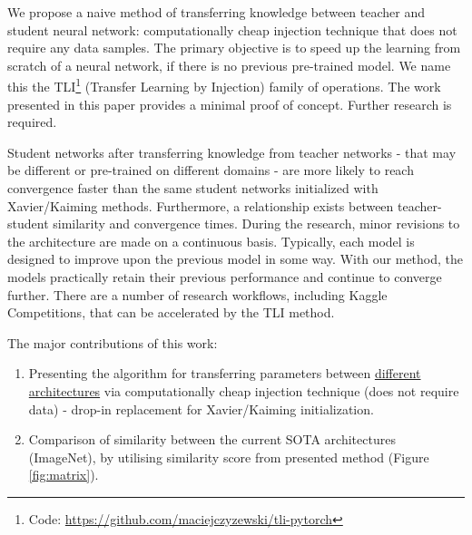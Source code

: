 \documentclass{article} %
\begin{document}

We propose a naive method of transferring knowledge between teacher and student
neural network: computationally cheap injection technique that does not require
any data samples.
%
The primary objective is to speed up the learning from scratch of a neural
network, if there is no previous pre-trained model.
%
We name this the TLI\footnote{Code: \url{https://github.com/maciejczyzewski/tli-pytorch}}
 (Transfer Learning by Injection) family of operations.
%
The work presented in this paper provides a minimal proof of concept. Further
research is required.

Student networks after transferring knowledge from teacher networks - that may
be different or pre-trained on different domains - are more likely to reach
convergence faster than the same student networks initialized with
Xavier/Kaiming methods.
%
Furthermore, a relationship exists between teacher-student similarity and
convergence times.
%
During the research, minor revisions to the architecture are made on a
continuous basis.
%
Typically, each model is designed to improve upon the previous model in some
way.
%
With our method, the models practically retain their previous performance and
continue to converge further.
%
There are a number of research workflows, including Kaggle Competitions, that
can be accelerated by the TLI method.

\newpage

The major contributions of this work:

\begin{enumerate}
	\item Presenting the algorithm for transferring parameters between
\underline{different} \underline{architectures} via computationally cheap
injection technique (does not require data) - drop-in replacement for
		Xavier/Kaiming initialization\citep{he2015delving}.
	\item Comparison of similarity between the current SOTA architectures
		(ImageNet), by utilising similarity score from presented method
		(Figure \ref{fig:matrix}).
\end{enumerate}

\end{document}
